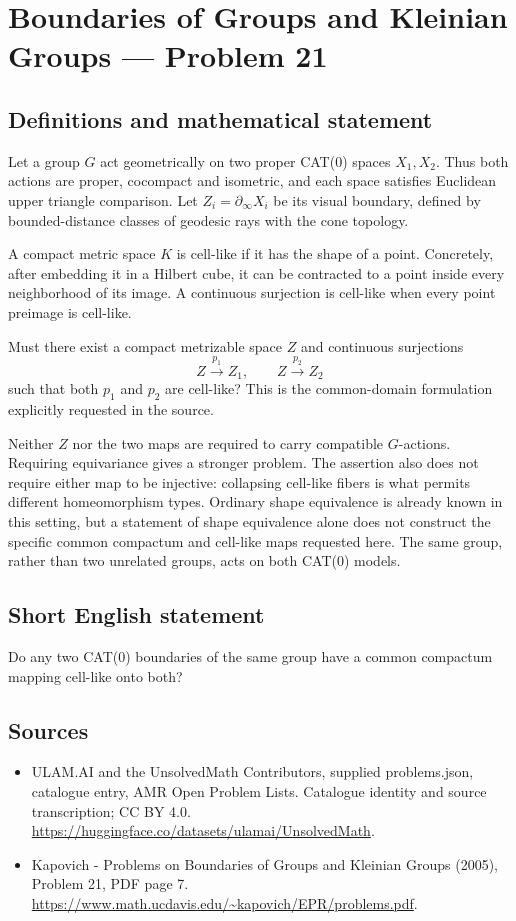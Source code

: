 \documentclass[11pt,a4paper]{article}
\begin{document}
\section*{Boundaries of Groups and Kleinian Groups — Problem 21}\label{statement}

\subsection{Definitions and mathematical statement}
Let a group $G$ act geometrically on two proper CAT(0) spaces $X_1,X_2$. Thus both actions are proper, cocompact and isometric, and each space satisfies Euclidean upper triangle comparison. Let $Z_i=\partial_\infty X_i$ be its visual boundary, defined by bounded-distance classes of geodesic rays with the cone topology.

A compact metric space $K$ is cell-like if it has the shape of a point. Concretely, after embedding it in a Hilbert cube, it can be contracted to a point inside every neighborhood of its image. A continuous surjection is cell-like when every point preimage is cell-like.

Must there exist a compact metrizable space $Z$ and continuous surjections
\[
 Z\xrightarrow{\ p_1\ }Z_1,\qquad Z\xrightarrow{\ p_2\ }Z_2
\]
such that both $p_1$ and $p_2$ are cell-like? This is the common-domain formulation explicitly requested in the source.

Neither $Z$ nor the two maps are required to carry compatible $G$-actions. Requiring equivariance gives a stronger problem. The assertion also does not require either map to be injective: collapsing cell-like fibers is what permits different homeomorphism types. Ordinary shape equivalence is already known in this setting, but a statement of shape equivalence alone does not construct the specific common compactum and cell-like maps requested here. The same group, rather than two unrelated groups, acts on both CAT(0) models.
\subsection{Short English statement}
Do any two CAT(0) boundaries of the same group have a common compactum mapping cell-like onto both?
\subsection{Sources}
\begin{itemize}
\item[S1] ULAM.AI and the UnsolvedMath Contributors, supplied problems.json, catalogue entry, AMR Open Problem Lists. Catalogue identity and source transcription; CC BY 4.0.
\url{https://huggingface.co/datasets/ulamai/UnsolvedMath}.
\item[S2] Kapovich - Problems on Boundaries of Groups and Kleinian Groups (2005), Problem 21, PDF page 7. 
\url{https://www.math.ucdavis.edu/~kapovich/EPR/problems.pdf}.
\end{itemize}
\end{document}
